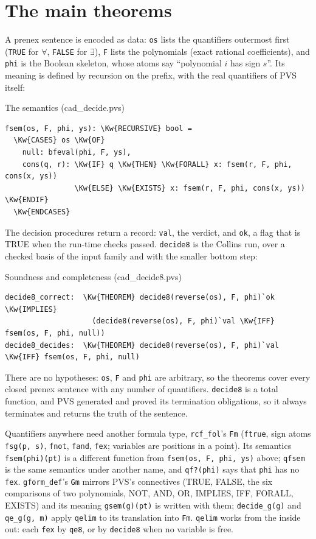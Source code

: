 \documentclass[11pt]{article}
\newcommand\Kw[1]{\textcolor{accent}{\textbf{#1}}}
\newcommand\Cm[1]{\textcolor{muted}{#1}}
\begin{document}
\section{The main theorems}
A prenex sentence is encoded as data: \texttt{os} lists the quantifiers outermost first (\texttt{TRUE} for $\forall$,
\texttt{FALSE} for $\exists$), \texttt{F} lists the polynomials (exact rational coefficients), and \texttt{phi} is the
Boolean skeleton, whose atoms say ``polynomial $i$ has sign $s$''. Its meaning is defined by recursion on the prefix, with
the real quantifiers of PVS itself:

\begin{thmbox}{The semantics \Cm{\normalfont(cad\_decide.pvs)}}
\begin{Verbatim}
fsem(os, F, phi, ys): \Kw{RECURSIVE} bool =
  \Kw{CASES} os \Kw{OF}
    null: bfeval(phi, F, ys),
    cons(q, r): \Kw{IF} q \Kw{THEN} \Kw{FORALL} x: fsem(r, F, phi, cons(x, ys))
                \Kw{ELSE} \Kw{EXISTS} x: fsem(r, F, phi, cons(x, ys)) \Kw{ENDIF}
  \Kw{ENDCASES}
\end{Verbatim}
\end{thmbox}

The decision procedures return a record: \texttt{val}, the verdict, and \texttt{ok}, a flag that is TRUE when the
run-time checks passed. \texttt{decide8} is the Collins run, over a checked basis of the input family and with the
smaller bottom step:

\begin{thmbox}{Soundness and completeness \Cm{\normalfont(cad\_decide8.pvs)}}
\begin{Verbatim}
decide8_correct:  \Kw{THEOREM} decide8(reverse(os), F, phi)`ok \Kw{IMPLIES}
                    (decide8(reverse(os), F, phi)`val \Kw{IFF} fsem(os, F, phi, null))
decide8_decides:  \Kw{THEOREM} decide8(reverse(os), F, phi)`val \Kw{IFF} fsem(os, F, phi, null)
\end{Verbatim}
\end{thmbox}

There are no hypotheses: \texttt{os}, \texttt{F} and \texttt{phi} are arbitrary, so the theorems cover every closed
prenex sentence with any number of quantifiers. \texttt{decide8} is a total function, and PVS generated and proved
its termination obligations, so it always terminates and returns the truth of the sentence.

Quantifiers anywhere need another formula type, \texttt{rcf\_fol}'s \texttt{Fm} (\texttt{ftrue}, sign atoms
\texttt{fsg(p, s)}, \texttt{fnot}, \texttt{fand}, \texttt{fex}; variables are positions in a point). Its semantics
\texttt{fsem(phi)(pt)} is a different function from \texttt{fsem(os, F, phi, ys)} above; \texttt{qfsem} is the same
semantics under another name, and \texttt{qf?(phi)} says that \texttt{phi} has no \texttt{fex}. \texttt{gform\_def}'s
\texttt{Gm} mirrors PVS's connectives (TRUE, FALSE, the six comparisons of two polynomials, NOT, AND, OR, IMPLIES, IFF, FORALL,
EXISTS) and its meaning \texttt{gsem(g)(pt)} is written with them; \texttt{decide\_g(g)} and \texttt{qe\_g(g, m)} apply
\texttt{qelim} to its translation into \texttt{Fm}. \texttt{qelim} works from the inside out: each \texttt{fex} by
\texttt{qe8}, or by \texttt{decide8} when no variable is free.
\end{document}
